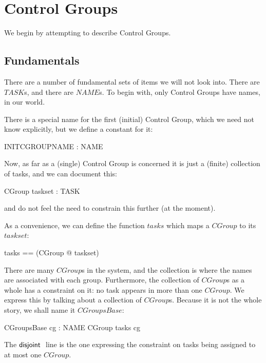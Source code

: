 \documentclass[a4paper,twoside,12pt]{article}
\begin{document}
\section{Control Groups}

We begin by attempting to describe Control Groups.

\subsection{Fundamentals}
There are a number of fundamental sets of items we will not look into. There are $TASK$s, and there are $NAME$s. To begin with, only Control Groups have names, in our world.

\begin{zed}
\end{zed}

There is a special name for the first (initial) Control Group, which we need not know explicitly, but we define a constant for it:

\begin{axdef}{}
INITCGROUPNAME : NAME
\end{axdef}

Now, as far as a (single) Control Group is concerned it is just a (finite) collection of tasks, and we can document this:

\begin{schema}{CGroup}
taskset : \finset TASK
\end{schema}
and do not feel the need to constrain this further (at the moment).

As a convenience, we can define the function $tasks$ which maps a $CGroup$ to its $taskset$:
\begin{zed}
tasks == (\lambda CGroup @ taskset)
\end{zed}

There are many $CGroup$s in the system, and the collection is where the names are associated with each group. Furthermore, the collection of $CGroup$s as a whole has a constraint on it: no task appears in more than one $CGroup$. We express this by talking about a collection of $CGroup$s. Because it is not the whole story, we shall name it $CGroupsBase$:

\begin{schema}{CGroupsBase}
cg : NAME \ffun CGroup
\where
\disjoint tasks \circ cg
\end{schema}
The ${\mathsf{disjoint}}\;$ line is the one expressing the constraint on tasks being assigned to at most one $CGroup$.
\end{document}
